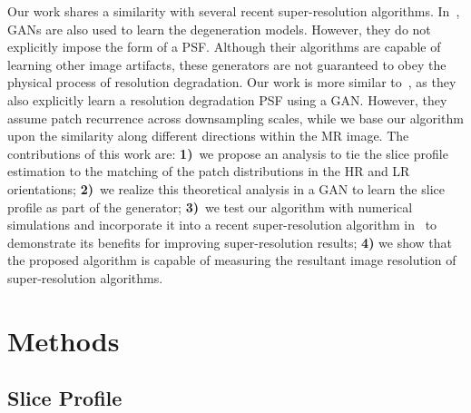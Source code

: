 \documentclass[runningheads]{llncs}
\begin{document}
Our work shares a similarity with several recent super-resolution
algorithms. In~\cite{deng-2020-unpaired, chen-2020-indirect}, GANs are
also used to learn the degeneration models. However, they do not
explicitly impose the form of a PSF. Although their algorithms are
capable of learning other image artifacts, these generators are not
guaranteed to obey the physical process of resolution degradation. Our
work is more similar to~\cite{bell-2019-kernelgan}, as they also
explicitly learn a resolution degradation PSF using a GAN.
However, they assume patch recurrence across downsampling scales,
while we base our algorithm upon the similarity along different
directions within the MR image. The contributions of this work are:
\textbf{1)}~we propose an analysis to tie the slice profile estimation
to the matching of the patch distributions in the HR and LR
orientations; \textbf{2)}~we realize this theoretical analysis in
a GAN to learn the slice profile as part of the generator;
\textbf{3)}~we test our algorithm with numerical simulations and
incorporate it into a recent super-resolution algorithm
in~\cite{zhao-2018-smore} to demonstrate its benefits for improving
super-resolution results; \textbf{4)} we show that the proposed
algorithm is capable of measuring the resultant image resolution of
super-resolution algorithms.

\section{Methods}
%
\subsection{Slice Profile}
\end{document}
